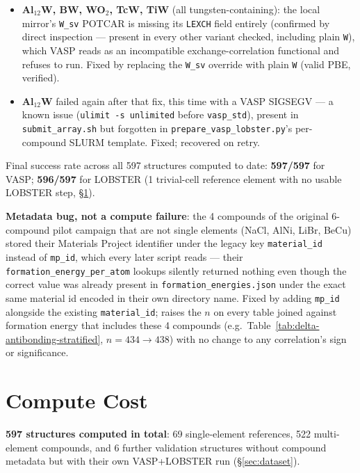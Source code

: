 \documentclass[11pt,a4paper]{article}
\begin{document}
\begin{itemize}
  \item \textbf{Al$_{12}$W, BW, WO$_2$, TcW, TiW} (all tungsten-containing):
    the local mirror's \texttt{W\_sv} POTCAR is missing its \texttt{LEXCH}
    field entirely (confirmed by direct inspection --- present in every
    other variant checked, including plain \texttt{W}), which VASP reads
    as an incompatible exchange-correlation functional and refuses to run.
    Fixed by replacing the \texttt{W\_sv} override with plain \texttt{W}
    (valid PBE, verified).
  \item \textbf{Al$_{12}$W} failed again after that fix, this time with a
    VASP SIGSEGV --- a known issue
    (\texttt{ulimit -s unlimited} before \texttt{vasp\_std}), present in
    \texttt{submit\_array.sh} but forgotten in
    \texttt{prepare\_vasp\_lobster.py}'s per-compound SLURM template.
    Fixed; recovered on retry.
\end{itemize}

Final success rate across all 597 structures computed to date:
\textbf{597/597} for VASP; \textbf{596/597} for LOBSTER (1 trivial-cell
reference element with no usable LOBSTER step, \S\ref{sec:cost}).

\textbf{Metadata bug, not a compute failure}: the 4 compounds of the
original 6-compound pilot campaign that are not single elements
(NaCl, AlNi, LiBr, BeCu) stored their Materials Project identifier
under the legacy key \texttt{material\_id} instead of \texttt{mp\_id},
which every later script reads --- their \texttt{formation\_energy\_per\_atom}
lookups silently returned nothing even though the correct value was
already present in \texttt{formation\_energies.json} under the exact
same material id encoded in their own directory name. Fixed by adding
\texttt{mp\_id} alongside the existing \texttt{material\_id}; raises the
$n$ on every table joined against formation energy that includes these
4 compounds (e.g.\ Table~\ref{tab:delta-antibonding-stratified},
$n=434\to438$) with no change to any correlation's sign or significance.

\section{Compute Cost}
\label{sec:cost}

\textbf{597 structures computed in total}: 69 single-element references,
522 multi-element compounds, and 6 further validation structures without
compound metadata but with their own VASP+LOBSTER run
(\S\ref{sec:dataset}).
\end{document}
